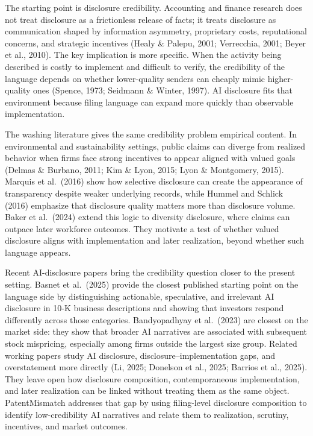 The starting point is disclosure credibility. Accounting and finance research does not treat disclosure as a frictionless release of facts; it treats disclosure as communication shaped by information asymmetry, proprietary costs, reputational concerns, and strategic incentives (Healy \& Palepu, 2001; Verrecchia, 2001; Beyer et al., 2010). The key implication is more specific. When the activity being described is costly to implement and difficult to verify, the credibility of the language depends on whether lower-quality senders can cheaply mimic higher-quality ones (Spence, 1973; Seidmann \& Winter, 1997). AI disclosure fits that environment because filing language can expand more quickly than observable implementation.

The washing literature gives the same credibility problem empirical content. In environmental and sustainability settings, public claims can diverge from realized behavior when firms face strong incentives to appear aligned with valued goals (Delmas \& Burbano, 2011; Kim \& Lyon, 2015; Lyon \& Montgomery, 2015). Marquis et al.~(2016) show how selective disclosure can create the appearance of transparency despite weaker underlying records, while Hummel and Schlick (2016) emphasize that disclosure quality matters more than disclosure volume. Baker et al.~(2024) extend this logic to diversity disclosure, where claims can outpace later workforce outcomes. They motivate a test of whether valued disclosure aligns with implementation and later realization, beyond whether such language appears.

Recent AI-disclosure papers bring the credibility question closer to the present setting. Basnet et al.~(2025) provide the closest published starting point on the language side by distinguishing actionable, speculative, and irrelevant AI disclosure in 10-K business descriptions and showing that investors respond differently across those categories. Bandyopadhyay et al.~(2023) are closest on the market side: they show that broader AI narratives are associated with subsequent stock mispricing, especially among firms outside the largest size group. Related working papers study AI disclosure, disclosure--implementation gaps, and overstatement more directly (Li, 2025; Donelson et al., 2025; Barrios et al., 2025). They leave open how disclosure composition, contemporaneous implementation, and later realization can be linked without treating them as the same object. PatentMismatch addresses that gap by using filing-level disclosure composition to identify low-credibility AI narratives and relate them to realization, scrutiny, incentives, and market outcomes.

